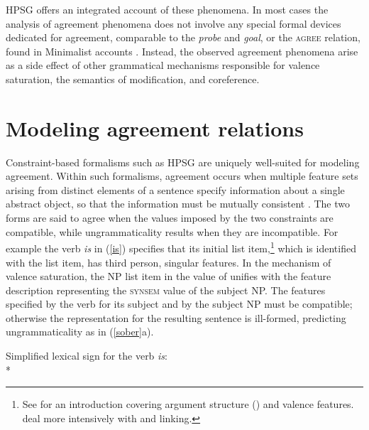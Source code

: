 \documentclass[output=paper,biblatex,babelshorthands,newtxmath,draftmode,colorlinks,citecolor=brown]{langscibook}
\begin{document}
HPSG offers an integrated account of these phenomena. In most cases the analysis of agreement phenomena does not involve any  special formal devices dedicated for agreement, comparable to the \textit{probe} and \textit{goal}, or the \textsc{agree} relation, found in Minimalist accounts \citep{Chomsky2000b-u}.  Instead, the observed agreement phenomena arise as a side effect of other grammatical mechanisms responsible for valence saturation, the semantics of modification, and coreference.  

\section{Modeling agreement relations} 
\label{unif-sec}\label{agreement:sec-unification}

\largerpage[2]
Constraint-based formalisms such as HPSG are uniquely well-suited for modeling agreement.  
Within such formalisms, agreement occurs when 
multiple feature sets
 arising from distinct elements of a sentence specify information about a single abstract object, so that the information must be mutually consistent \citep{Kay:1984}.  
The two forms are said to agree when the values imposed by the two constraints are compatible, while ungrammaticality results when they are incompatible.  For example the  verb \textit{is} in (\ref{is}) specifies that its initial \argst list item,\footnote{
See  for an introduction covering argument structure (\argst) and valence features.  deal more intensively with \argst and linking.} which is identified with the \subj list item, has third person, singular features.  In the mechanism of valence saturation, the NP list item in the value of \subj unifies with the feature description representing the \textsc{synsem} value of the subject NP.  The features specified by the verb for its subject and by the subject NP must be compatible; otherwise the representation for the resulting sentence is ill-formed, predicting ungrammaticality as in (\ref{sober}a).  

\ea		
\label{is} 
Simplified lexical sign for the verb \textit{is}:\\*
\z
\end{document}
